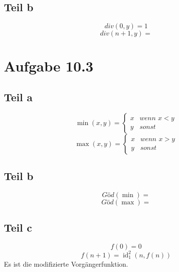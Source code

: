 \documentclass[10pt,a4paper]{article}
\DeclareMathOperator{\id}{id}
\begin{document}
\subsection{Teil b}

\begin{equation}
  div(0, y) = 1
\end{equation}
\begin{equation}
  div(n + 1, y) =
\end{equation}

\section{Aufgabe 10.3}

\subsection{Teil a}

\begin{equation}
  \min(x, y) = \begin{cases}
    x & \textit{wenn $x < y$}\\
    y & \textit{sonst}
  \end{cases}
\end{equation}
\begin{equation}
  \max(x, y) = \begin{cases}
    x & \textit{wenn $x > y$}\\
    y & \textit{sonst}
  \end{cases}
\end{equation}

\subsection{Teil b}

\begin{equation}
  Göd(\min) =
\end{equation}
\begin{equation}
  Göd(\max) =
\end{equation}

\subsection{Teil c}

\begin{equation}
  f(0) = 0
\end{equation}
\begin{equation}
  f(n + 1) = \id^{2}_{1}(n, f(n))
\end{equation}
Es ist die modifizierte Vorgängerfunktion.
\end{document}
